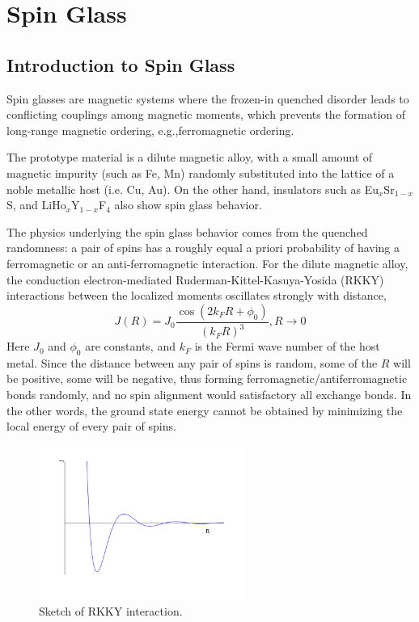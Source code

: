 \chapter{Spin Glass}
\label{chap:SGintro}
\section{Introduction to Spin Glass}
Spin glasses \cite{Binder-Young-1986} are magnetic systems where the frozen-in quenched  
disorder leads to conflicting couplings among magnetic moments, which prevents the formation 
of long-range magnetic ordering, e.g.,ferromagnetic ordering.

The prototype material is a dilute magnetic alloy, with a small amount of 
magnetic impurity (such as Fe, Mn) randomly substituted into the lattice of a 
noble metallic host (i.e. Cu, Au). On the other hand, insulators such as 
Eu$_x$Sr$_{1-x}$S, and LiHo$_{x}$Y$_{1-x}$F$_{4}$ also show spin glass behavior.
 

The physics underlying the spin glass behavior comes from the quenched 
randomness: a pair of spins has a roughly equal a priori probability of having
a ferromagnetic or an anti-ferromagnetic interaction. For the dilute magnetic 
alloy, the conduction electron-mediated 
Ruderman-Kittel-Kasuya-Yosida (RKKY) interactions between the localized moments
 oscillates strongly with distance, 
 \begin{equation}
   \label{eq:RKKY}
   J(R)=J_0\frac{\cos(2k_FR+\phi_0)}{(k_FR)^3}, R\rightarrow 0
 \end{equation}
Here $J_0$ and $\phi_0$ are constants, and $k_F$ is the Fermi wave number of the
host metal. Since the distance between any pair of spins is random, some of the $R$
will be positive, some will be negative,
thus forming ferromagnetic/antiferromagnetic bonds randomly, and no spin 
alignment would satisfactory all exchange bonds. In the other words, the 
ground state energy cannot be obtained by minimizing the local energy 
of every pair of spins.

\begin{figure}[!h]
  \label{fig:rkky}
  \centering
  \includegraphics[width=0.6\textwidth]{img/RKKY.png}
  \caption{Sketch of RKKY interaction.}
\end{figure}

